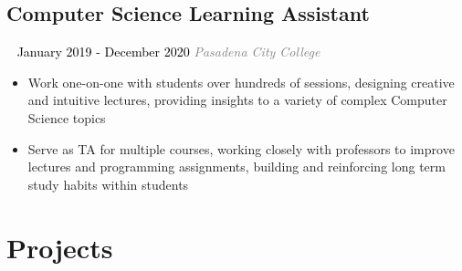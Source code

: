 \documentclass{article}
\newcommand{\resumesection}[3]{
    \subsection*{#1}
    \ 
    \normalsize
    \normalsize
    \hfill
    \textcolor{black}{#3}
    \normalsize
    \newline
    \small
    \textcolor{grey}{\emph{#2}}
}
\begin{document}
\resumesection{Computer Science Learning Assistant}{Pasadena City College}{January 2019 - December 2020}
\begin{itemize}
    \item Work one-on-one with students over hundreds of sessions, designing creative and intuitive lectures, providing insights to a variety of complex Computer Science topics
    \item Serve as TA for multiple courses, working closely with professors to improve lectures and programming assignments, building and reinforcing long term study habits within students
\end{itemize}
\section*{Projects}
\end{document}
